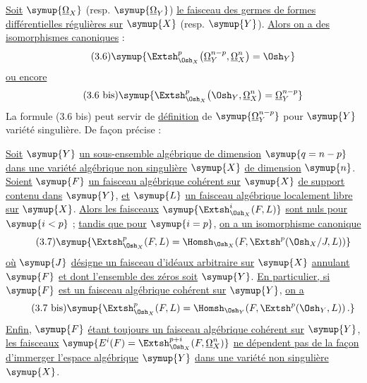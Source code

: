 \uline{Soit} $\symup{\underline{\Omega}_X}$ (resp. $\symup{\underline{\Omega}_Y}$) \uline{le faisceau des germes de formes
différentielles régulières sur} $\symup{X}$ (resp. $\symup{Y}$). \uline{Alors on a des isomorphismes
canoniques} :
\begin{equation}\tag{3.6}
  \symup{\Extsh_{\Osh_X}^{p}\bigl(\underline{\Omega}_Y^{n-p},\underline{\Omega}_X^{n}\bigr)=\Osh_Y}
\end{equation}
\uline{ou encore}
\begin{equation}\tag{3.6 bis}
  \symup{\Extsh_{\Osh_X}^{p}\bigl(\Osh_Y,\underline{\Omega}_X^{n}\bigr)=\underline{\Omega}_Y^{n-p}}
\end{equation}
La formule (3.6 bis) peut servir de \uline{définition} de $\symup{\underline{\Omega}_Y^{n-p}}$ pour $\symup{Y}$
variété singulière. De façon précise :

 \uline{Soit} $\symup{Y}$ \uline{un sous-ensemble algébrique de dimension}
$\symup{q=n-p}$ \uline{dans une variété algébrique non singulière} $\symup{X}$ \uline{de dimension} $\symup{n}$. \uline{Soient}
$\symup{F}$ \uline{un faisceau algébrique cohérent sur} $\symup{X}$ \uline{de support contenu dans} $\symup{Y}$, \uline{et} $\symup{L}$
\uline{un faisceau algébrique localement libre sur} $\symup{X}$. \uline{Alors les faisceaux}
$\symup{\Extsh_{\Osh_X}^{i}(F,L)}$ \uline{sont nuls pour} $\symup{i<p}$ ; \uline{tandis que pour} $\symup{i=p}$, \uline{on a un
isomorphisme canonique}
\begin{equation}\tag{3.7}
  \symup{\Extsh_{\Osh_X}^{p}(F,L)
  =\Homsh_{\Osh_X}\!\left(F,
  \Extsh^{p}(\Osh_X/J,L)\right)}
\end{equation}
\uline{où} $\symup{J}$ \uline{désigne un faisceau d'idéaux arbitraire sur} $\symup{X}$ \uline{annulant} $\symup{F}$ \uline{et dont
l'ensemble des zéros soit} $\symup{Y}$. \uline{En particulier, si} $\symup{F}$ \uline{est un faisceau algébrique
cohérent sur} $\symup{Y}$, \uline{on a}
\begin{equation}\tag{3.7 bis}
  \symup{\Extsh_{\Osh_X}^{p}(F,L)
  =\Homsh_{\Osh_Y}\!\left(F,\Extsh^{p}(\Osh_Y,L)\right).}
\end{equation}
\uline{Enfin}, $\symup{F}$ \uline{étant toujours un faisceau algébrique cohérent sur} $\symup{Y}$, \uline{les faisceaux}
$\symup{E^{i}(F)=\Extsh_{\Osh_X}^{p+i}(F,\underline{\Omega}_X^{n})}$ \uline{ne dépendent pas de la façon d'immerger l'espace algébrique} $\symup{Y}$ \uline{dans une variété
non singulière} $\symup{X}$.

